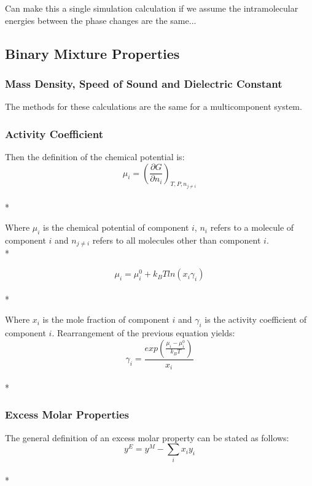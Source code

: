 \documentclass[a4paper,12pt]{article}
\begin{document}
\noindent Can make this a single simulation calculation if we assume the intramolecular energies between the phase changes are the same...


\subsection{Binary Mixture Properties} 
\subsubsection{Mass Density, Speed of Sound and Dielectric Constant}
\noindent The methods for these calculations are the same for a multicomponent system.

\subsubsection{Activity Coefficient}
\noindent Then the definition of the chemical potential is:
\begin{equation}\mu_{i} = \left(\frac{\partial G}{\partial n_{i}}\right)_{T,P,n_{j \neq i}}\end{equation}\\*

\noindent Where $\mu_i$ is the chemical potential of component $i$, $n_i$ refers to a molecule of component $i$ and $n_{j \neq i}$ refers to all molecules other than component $i$.\\*

\begin{equation}\mu_{i} = \mu^0_i + k_B T ln\left(x_i \gamma_i\right)\end{equation}\\*

\noindent Where $x_i$ is the mole fraction of component $i$ and $\gamma_i$ is the activity coefficient of component $i$. Rearrangement of the previous equation yields:
\begin{equation}\gamma_i = \frac{exp\left(\frac{\mu_i - \mu^0_i}{k_B T}\right)}{x_i}\end{equation}\\*

\subsubsection{Excess Molar Properties}
\noindent The general definition of an excess molar property can be stated as follows:
\begin{equation}y^{E} = y^{M} - \sum_{i} x_i y_i\end{equation}\\*
\end{document}
